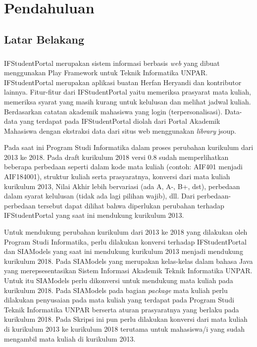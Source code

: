 \chapter{Pendahuluan}
\label{chap:intro}
   
\section{Latar Belakang}
\label{sec:label}

\paragraph{} IFStudentPortal merupakan sistem informasi berbasis  \textit{web} yang dibuat menggunakan Play Framework untuk Teknik Informatika UNPAR. IFStudentPortal merupakan aplikasi buatan Herfan Heryandi dan kontributor lainnya. Fitur-fitur dari IFStudentPortal yaitu memeriksa prasyarat mata kuliah, memeriksa syarat yang masih kurang untuk kelulusan dan melihat jadwal kuliah. Berdasarkan catatan akademik mahasiswa yang login (terpersonalisasi). Data-data yang terdapat pada IFStudentPortal diolah dari Portal Akademik Mahasiswa dengan ekstraksi data dari situs web menggunakan \textit{library} jsoup.

Pada saat ini Program Studi Informatika dalam proses perubahan kurikulum dari 2013 ke 2018. Pada draft kurikulum 2018 versi 0.8 sudah memperlihatkan beberapa perbedaan seperti dalam kode mata kuliah (contoh: AIF401 menjadi AIF184001), struktur kuliah serta prasyaratnya, konversi dari mata kuliah kurikulum 2013, Nilai Akhir lebih bervariasi (ada A, A-, B+, dst), perbedaan dalam syarat kelulusan (tidak ada lagi pilihan wajib), dll. Dari perbedaan-perbedaan tersebut dapat dilihat bahwa diperlukan perubahan terhadap IFStudentPortal yang saat ini mendukung kurikulum 2013. 

Untuk mendukung perubahan kurikulum dari 2013 ke 2018 yang dilakukan oleh Program Studi Informatika, perlu dilakukan konversi terhadap IFStudentPortal dan SIAModels yang saat ini mendukung kurikulum 2013 menjadi mendukung kurikulum 2018. Pada SIAModels yang merupakan kelas-kelas dalam bahasa Java yang merepsesentasikan Sistem Informasi Akademik Teknik Informatika UNPAR. Untuk itu SIAModels perlu dikonversi untuk mendukung mata kuliah pada kurikulum 2018. Pada SIAModels pada bagian \textit{package} mata kuliah perlu dilakukan penyusaian pada mata kuliah yang terdapat pada Program Studi Teknik Informatika UNPAR berserta aturan prasyaratnya yang berlaku pada kurikulum 2018. Pada Skripsi ini pun perlu dilakukan konversi dari mata kuliah di kurikulum 2013 ke kurikulum 2018 terutama untuk mahasiswa/i yang sudah mengambil mata kuliah di kurikulum 2013.

